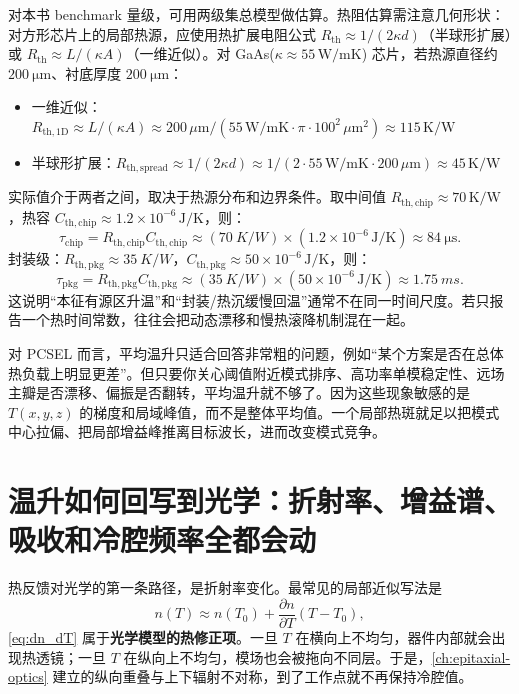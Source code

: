 对本书 benchmark 量级，可用两级集总模型做估算。热阻估算需注意几何形状：对方形芯片上的局部热源，应使用热扩展电阻公式 $R_{\mathrm{th}}\approx 1/(2\kappa d)$（半球形扩展）或 $R_{\mathrm{th}}\approx L/(\kappa A)$（一维近似）。对 GaAs($\kappa\approx 55\,\mathrm{W/mK}$) 芯片，若热源直径约 $\SI{200}{\micro\meter}$、衬底厚度 $\SI{200}{\micro\meter}$：
\begin{itemize}
\item 一维近似：$R_{\mathrm{th,1D}} \approx L/(\kappa A) \approx 200\,\mu\mathrm{m}/(55\,\mathrm{W/mK} \cdot \pi\cdot 100^2\,\mu\mathrm{m}^2) \approx 115\,\mathrm{K/W}$
\item 半球形扩展：$R_{\mathrm{th,spread}} \approx 1/(2\kappa d) \approx 1/(2\cdot 55\,\mathrm{W/mK} \cdot 200\,\mu\mathrm{m}) \approx 45\,\mathrm{K/W}$
\end{itemize}
实际值介于两者之间，取决于热源分布和边界条件。取中间值 $R_{\mathrm{th,chip}}\approx 70\,\mathrm{K/W}$，热容 $C_{\mathrm{th,chip}}\approx 1.2\times10^{-6}\,\mathrm{J/K}$，则：
\[
\tau_{\mathrm{chip}} = R_{\mathrm{th,chip}}C_{\mathrm{th,chip}}
\approx (\SI{70}{K/W})\times(1.2\times10^{-6}\,\mathrm{J/K})
\approx \SI{84}{\micro\second}.
\]
封装级：$R_{\mathrm{th,pkg}}\approx \SI{35}{K/W}$，$C_{\mathrm{th,pkg}}\approx 50\times10^{-6}\,\mathrm{J/K}$，则：
\[
\tau_{\mathrm{pkg}} = R_{\mathrm{th,pkg}}C_{\mathrm{th,pkg}}
\approx (\SI{35}{K/W})\times(50\times10^{-6}\,\mathrm{J/K})
\approx \SI{1.75}{ms}.
\]
这说明“本征有源区升温”和“封装/热沉缓慢回温”通常不在同一时间尺度。若只报告一个热时间常数，往往会把动态漂移和慢热滚降机制混在一起。

对 PCSEL 而言，平均温升只适合回答非常粗的问题，例如“某个方案是否在总体热负载上明显更差”。但只要你关心阈值附近模式排序、高功率单模稳定性、远场主瓣是否漂移、偏振是否翻转，平均温升就不够了。因为这些现象敏感的是 $T(x,y,z)$ 的梯度和局域峰值，而不是整体平均值。一个局部热斑就足以把模式中心拉偏、把局部增益峰推离目标波长，进而改变模式竞争。

\section{温升如何回写到光学：折射率、增益谱、吸收和冷腔频率全都会动}
热反馈对光学的第一条路径，是折射率变化。最常见的局部近似写法是
\begin{equation}
 n(T) \approx n(T_0) + \frac{\partial n}{\partial T}(T-T_0),
\label{eq:dn_dT}
\end{equation}
\cref{eq:dn_dT} 属于\textbf{光学模型的热修正项}。一旦 $T$ 在横向上不均匀，器件内部就会出现热透镜；一旦 $T$ 在纵向上不均匀，模场也会被拖向不同层。于是，\cref{ch:epitaxial-optics} 建立的纵向重叠与上下辐射不对称，到了工作点就不再保持冷腔值。

